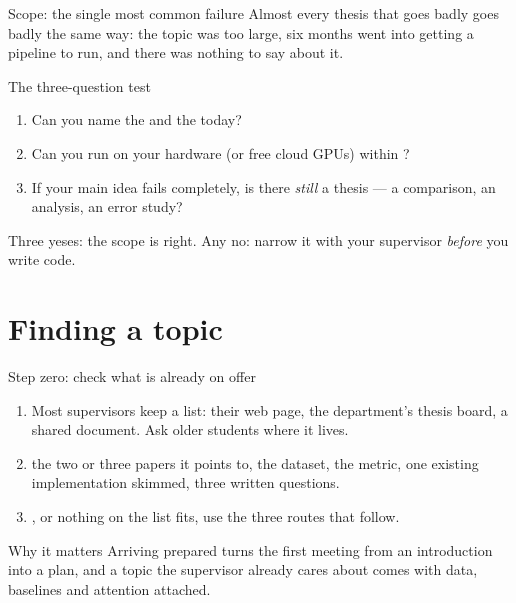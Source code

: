 \documentclass[aspectratio=169,11pt]{beamer}
\begin{document}
\begin{frame}{Scope: the single most common failure}
Almost every thesis that goes badly goes badly the same way: the topic was too
large, six months went into getting a pipeline to run, and there was nothing to
say about it.

\vspace{4mm}
\begin{block}{The three-question test}
\begin{enumerate}
  \item Can you name the  and the  today?
  \item Can you run  on your hardware (or free cloud GPUs)
        within ?
  \item If your main idea fails completely, is there \emph{still} a thesis ---
        a comparison, an analysis, an error study?
\end{enumerate}
\end{block}
\vspace{2mm}
\centering
Three yeses: the scope is right. Any no: narrow it with your supervisor
\emph{before} you write code.
\end{frame}

\section{Finding a topic}

\begin{frame}{Step zero: check what is already on offer}
\begin{enumerate}
  \item {} Most supervisors keep a list:
        their web page, the department's thesis board, a shared document. Ask
        older students where it lives.
  \item {} the two or three papers it points to, the dataset, the
        metric, one existing implementation skimmed, three written questions.
  \item {}, or nothing on the list fits, use
        the three routes that follow.
\end{enumerate}
\vspace{3mm}
\begin{block}{Why it matters}
\footnotesize
Arriving prepared turns the first meeting from an introduction into a plan,
and a topic the supervisor already cares about comes with data, baselines and
attention attached.
\end{block}
\end{frame}
\end{document}
